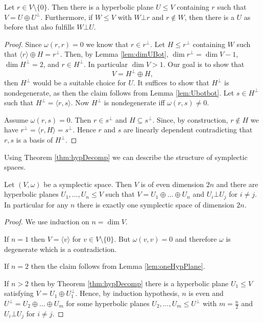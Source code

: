 \begin{theorem}\label{thm:hypDecomp}
	Let $r\in V\setminus\{0\}$. Then there is a hyperbolic plane $U\leq V$ containing $r$ such that $V=U\oplus U^\bot$. Furthermore, if $W\leq V$ with $W\bot r$ and $r\notin W$, then there is a $U$ as before that also fulfills $W\bot U$.
\end{theorem}
\begin{proof}
	Since $\omega(r,r)=0$ we know that $r\in r^\bot$. Let $H\leq r^\bot$ containing $W$ such that $\langle r\rangle\oplus H=r^\bot$. Then, by Lemma \ref{lem:dimUBot}, $\dim r^\bot=\dim V-1$, $\dim H^\bot=2$, and $r\in H^\bot$. In particular $\dim V>1$.
	Our goal is to show that \[V=H^\bot\oplus H,\] then $H^\bot$ would be a suitable choice for $U$.
	It suffices to show that $H^\bot$ is nondegenerate, as then the claim follows from Lemma \ref{lem:Ubotbot}. Let $s\in H^\bot$ such that $H^\bot=\langle r,s\rangle$. Now $H^\bot$ is nondegenerate iff $\omega(r,s)\not=0$. 
				
	Assume $\omega(r,s)=0$. Then $r\in s^\bot$ and $H\subseteq s^\bot$. Since, by construction, $r\notin H$ we have $r^\bot=\langle r,H\rangle=s^\bot$. Hence $r$ and $s$ are linearly dependent contradicting that $r,s$ is a basis of $H^\bot$.
				
\end{proof}
		
Using Theorem \ref{thm:hypDecomp} we can describe the structure of symplectic spaces.
		
\begin{corollary}\label{cor:structureSympl}
				
	Let $(V,\omega)$ be a symplectic space. Then $V$ is of even dimension $2n$ and there are hyperbolic planes $U_1,\dots, U_n\leq V$ such that $V=U_1\oplus\dots\oplus U_n$ and $U_i\bot U_j$ for $i\not=j$.
	In particular for any $n$ there is exactly one symplectic space of dimension $2n$.
\end{corollary}
\begin{proof}
	We use induction on $n=\dim V$.
				
	If $n=1$ then $V=\langle v\rangle$ for $v\in V\setminus\{0\}$. But $\omega(v,v)=0$ and therefore $\omega$ is degenerate which is a contradiction.
				
	If $n=2$ then the claim follows from Lemma \ref{lem:oneHypPlane}.
				
	If $n>2$ then by Theorem \ref{thm:hypDecomp} there is a hyperbolic plane $U_1\leq V$ satisfying $V=U_1\oplus U_1^\bot$. Hence, by induction hypothesis, $n$ is even and $U^\bot =U_2\oplus\dots \oplus U_m$ for some hyperbolic planes $U_2,\dots,U_m\leq U^\bot$ with $m=\frac{n}{2}$ and $U_i\bot U_j$ for $i\not=j$.
\end{proof}
		
